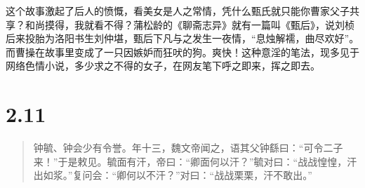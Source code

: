 \documentclass[]{book}
\begin{document}
这个故事激起了后人的愤慨，看美女是人之常情，凭什么甄氏就只能你曹家父子共享？和尚摸得，我就看不得？蒲松龄的《聊斋志异》就有一篇叫《甄后》，说刘桢后来投胎为洛阳书生刘仲堪，甄后下凡与之发生一夜情，``息烛解襦，曲尽欢好''。而曹操在故事里变成了一只因嫉妒而狂吠的狗。爽快！这种意淫的笔法，现多见于网络色情小说，多少求之不得的女子，在网友笔下呼之即来，挥之即去。

\section{2.11}\label{section-57}

\begin{quote}
钟毓、钟会少有令誉。年十三，魏文帝闻之，语其父钟繇曰：``可令二子来！''于是敕见。毓面有汗，帝曰：``卿面何以汗？''毓对曰：``战战惶惶，汗出如浆。''复问会：``卿何以不汗？''对曰：``战战栗栗，汗不敢出。''
\end{quote}
\end{document}
